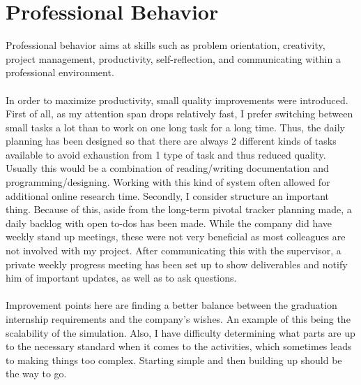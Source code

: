 \section{Professional Behavior}
Professional behavior aims at skills such as problem orientation, creativity, project management, productivity, self-reflection, and communicating within a professional environment.
\\\\
In order to maximize productivity, small quality improvements were introduced. First of all, as my attention span drops relatively fast, I prefer switching between small tasks a lot than to work on one long task for a long time. Thus, the daily planning has been designed so that there are always 2 different kinds of tasks available to avoid exhaustion from 1 type of task and thus reduced quality. Usually this would be a combination of reading/writing documentation and programming/designing. Working with this kind of system often allowed for additional online research time. Secondly, I consider structure an important thing. Because of this, aside from the long-term pivotal tracker planning made, a daily backlog with open to-dos has been made. While the company did have weekly stand up meetings, these were not very beneficial as most colleagues are not involved with my project. After communicating this with the supervisor, a private weekly progress meeting has been set up to show deliverables and notify him of important updates, as well as to ask questions.
\\\\
Improvement points here are finding a better balance between the graduation internship requirements and the company's wishes. An example of this being the scalability of the simulation. Also, I have difficulty determining what parts are up to the necessary standard when it comes to the activities, which sometimes leads to making things too complex. Starting simple and then building up should be the way to go.